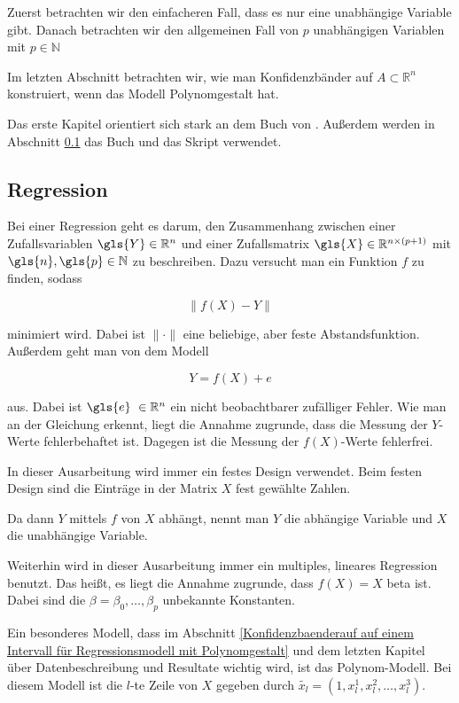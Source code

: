 \documentclass[12pt,a4paper]{article}
\theoremstyle{definition}
\theoremstyle{definition}
\theoremstyle{definition}
\begin{document}
Zuerst betrachten wir den einfacheren Fall, dass es nur eine unabhängige Variable gibt. Danach betrachten wir den allgemeinen Fall von $p$ unabhängigen Variablen mit $p \in \mathbb{N} $

Im letzten Abschnitt betrachten wir, wie man Konfidenzbänder auf $A \subset \mathbb{R}^n$ konstruiert, wenn das Modell Polynomgestalt hat.

Das erste Kapitel orientiert sich stark an dem Buch von \cite{Liu64}. Außerdem werden in Abschnitt \ref{Regression} das Buch \cite{Georgii09} und das Skript \cite{Kriv15} verwendet.


\subsection{Regression}
\label{Regression}
Bei einer Regression geht es darum, den Zusammenhang zwischen einer Zufallsvariablen $\gls{Y} \in \mathbb{R}^n$ und einer Zufallsmatrix $\gls{X} \in \mathbb{R}^{n \times (p+1)}$ mit $\gls{n}, \gls{p} \in \mathbb{N}$ zu beschreiben. Dazu versucht man ein Funktion $f$ zu finden, sodass

\begin{equation*}
\| f(X) - Y \|
\end{equation*}

minimiert wird. Dabei ist $ \| \cdot \|$ eine beliebige, aber feste Abstandsfunktion. Außerdem geht man von dem Modell

\begin{equation*}
Y = f(X) + e
\end{equation*}

aus. Dabei ist $\gls{e} ~ \in \mathbb{R}^n$ ein nicht beobachtbarer zufälliger Fehler. Wie man an der Gleichung erkennt, liegt die Annahme zugrunde, dass die Messung der $Y$-Werte fehlerbehaftet ist.
Dagegen ist die Messung der $f(X)$-Werte fehlerfrei.

In dieser Ausarbeitung wird immer ein festes Design verwendet. Beim festen Design sind die Einträge in der Matrix $X$ fest gewählte Zahlen.

Da dann $Y$ mittels $f$ von $X$ abhängt, nennt man $Y$ die abhängige Variable und $X$ die unabhängige Variable. 

Weiterhin wird in dieser Ausarbeitung immer ein multiples, lineares Regression benutzt. Das heißt, es liegt die Annahme zugrunde, dass $f(X) = X$ \gls{beta} ist. Dabei sind die $\beta = \beta_{0}, \ldots, \beta_{p}$ unbekannte Konstanten. 

Ein besonderes Modell, dass im Abschnitt \ref{Konfidenzbaenderauf auf einem Intervall für Regressionsmodell mit Polynomgestalt} und dem letzten Kapitel über Datenbeschreibung und Resultate wichtig wird, ist das Polynom-Modell. Bei diesem Modell ist die $l$-te Zeile von $X$ gegeben durch $\tilde{x_l} = (1, x_{l}^1, x_{l}^2, \ldots, x_{l}^3)$.
\end{document}
